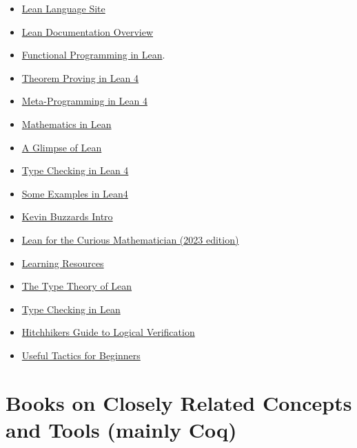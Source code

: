 \documentclass{book}
\providecommand{\tightlist}{%
  \setlength{\itemsep}{0pt}\setlength{\parskip}{0pt}}
\begin{document}
\begin{itemize}
\tightlist
\item
  \href{https://lean-lang.org/}{Lean Language Site}
\item
  \href{https://lean-lang.org/lean4/doc/}{Lean Documentation Overview}
\item
  \href{https://leanprover.github.io/functional_programming_in_lean/}{Functional Programming in Lean}.
\item
  \href{https://leanprover.github.io/theorem_proving_in_lean4/induction_and_recursion.html}{Theorem Proving in Lean 4}
\item
  \href{https://leanprover-community.github.io/lean4-metaprogramming-book/}{Meta-Programming in Lean 4}
\item
  \href{https://leanprover-community.github.io/mathematics_in_lean/mathematics_in_lean.pdf}{Mathematics in Lean}
\item
  \href{https://github.com/PatrickMassot/GlimpseOfLean}{A Glimpse of Lean}
\item
  \href{https://ammkrn.github.io/type_checking_in_lean4/}{Type Checking in Lean 4}
\item
  \href{https://lean-lang.org/lean4/doc/examples.html}{Some Examples in Lean4}
\item
  \href{https://leanprover-community.github.io/lean-perfectoid-spaces/type_theory.html}{Kevin Buzzard\textquotesingle s Intro}
\item
  \href{https://lftcm2023.github.io/tutorial/index.html}{Lean for the Curious Mathematician (2023 edition)}
\item
  \href{https://leanprover-community.github.io/learn.html}{Learning Resources}
\item
  \href{https://github.com/digama0/lean-type-theory/releases}{The Type Theory of Lean}
\item
  \href{https://ammkrn.github.io/type_checking_in_lean4/}{Type Checking in Lean}
\item
  \href{https://raw.githubusercontent.com/blanchette/logical_verification_2023/main/hitchhikers_guide.pdf}{Hitchhikers Guide to Logical Verification}
\item
  \href{https://github.com/madvorak/lean4-tactics}{Useful Tactics for Beginners}
\end{itemize}

\hypertarget{book__pandoc__debug__src__resources.md__books-on-closely-related-concepts-and-tools-mainly-coq}{%
\section*{Books on Closely Related Concepts and Tools (mainly Coq)}\label{book__pandoc__debug__src__resources.md__books-on-closely-related-concepts-and-tools-mainly-coq}}
\end{document}
